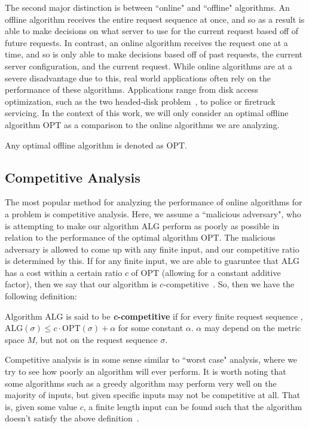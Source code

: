 The second major distinction is between ``online" and ``offline" algorithms. An offline algorithm receives the entire request sequence at once, and so as a result is able to make decisions on what server to use for the current request based off of future requests. In contrast, an online algorithm receives the request one at a time, and so is only able to make decisions based off of past requests, the current server configuration, and the current request. While online algorithms are at a severe disadvantage due to this, real world applications often rely on the performance of these algorithms. Applications range from disk access optimization, such as the two headed-disk problem~\cite{OnlineComp1998}, to police or firetruck servicing. In the context of this work, we will only consider an optimal offline algorithm $\mathrm{OPT}$ as a comparison to the online algorithms we are analyzing.

\begin{definition}
    Any optimal offline algorithm is denoted as $\mathrm{OPT}$.
\end{definition}

\subsection{Competitive Analysis}
\label{sec:compAna}
The most popular method for analyzing the performance of online algorithms for a problem is competitive analysis. Here, we assume a ``malicious adversary", who is attempting to make our algorithm $\mathrm{ALG}$ perform as poorly as possible in relation to the performance of the optimal algorithm $\mathrm{OPT}$. The malicious adversary is allowed to come up with any finite input, and our competitive ratio is determined by this. If for any finite input, we are able to guaruntee that $\mathrm{ALG}$ has a cost within a certain ratio $c$ of $\mathrm{OPT}$ (allowing for a constant additive factor), then we say that our algorithm is $c$-competitive~\cite{OnlineComp1998}. So, then we have the following definition: 

\begin{definition}
\label{def:comp}
Algorithm $\mathrm{ALG}$ is said to be \textbf{\textit{c}-competitive} if for every finite request sequence \s, $\mathrm{ALG}(\sigma) \leq c\cdot \mathrm{OPT}(\sigma)+\alpha$ for some constant $\alpha$. $\alpha$ may depend on the metric space $M$, but not on the request sequence $\sigma$.
\end{definition}

Competitive analysis is in some sense similar to ``worst case" analysis, where we try to see how poorly an algorithm will ever perform. It is worth noting that some algorithms such as a greedy algorithm may perform very well on the majority of inputs, but given specific inputs may not be competitive at all. That is, given some value $c$, a finite length input can be found such that the algorithm doesn't satisfy the above definition~\cite{OnlineComp1998}.

